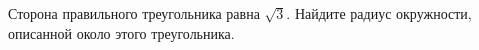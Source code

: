 \begin{ex}
	\begin{condition}
		Сторона правильного треугольника равна \( \sqrt{3} \). Найдите радиус окружности, описанной около этого треугольника.
	\end{condition}
\end{ex}